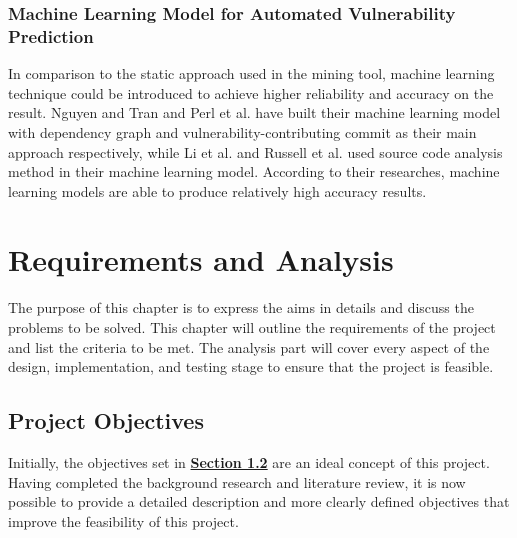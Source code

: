 \documentclass[12pt, a4paper]{report}
\begin{document}
\subsection{Machine Learning Model for Automated Vulnerability Prediction}
In comparison to the static approach used in the mining tool, machine learning technique could be
introduced to achieve higher reliability and accuracy on the result. Nguyen and Tran
\cite{nguyen_2010} and Perl et al. \cite{perl_2015} have built their machine learning model with
dependency graph and vulnerability-contributing commit as their main approach respectively, while Li
et al. \cite{li_2016} and Russell et al. \cite{russell_2018} used source code analysis method in
their machine learning model. According to their researches, machine learning models are able to
produce relatively high accuracy results.

\chapter{Requirements and Analysis}
The purpose of this chapter is to express the aims in details and discuss the problems to be solved.
This chapter will outline the requirements of the project and list the criteria to be met. The
analysis part will cover every aspect of the design, implementation, and testing stage to ensure
that the project is feasible.

\section{Project Objectives}
Initially, the objectives set in \hyperref[sec:objectives]{\textbf{Section 1.2}} are an ideal
concept of this project. Having completed the background research and literature review, it is now
possible to provide a detailed description and more clearly defined objectives that improve the
feasibility of this project.
\end{document}
